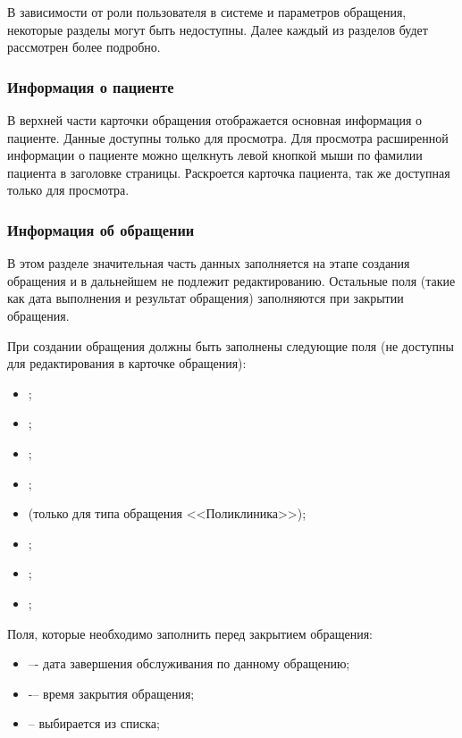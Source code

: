 {В зависимости от роли пользователя в системе и параметров обращения, некоторые разделы могут быть недоступны. Далее каждый из разделов будет рассмотрен более подробно.

\subsubsection{Информация о пациенте}

В верхней части карточки обращения отображается основная информация о пациенте. Данные доступны только для просмотра. Для просмотра расширенной информации о пациенте можно щелкнуть левой кнопкой мыши по фамилии пациента в заголовке страницы. Раскроется карточка пациента, так же доступная только для просмотра. 

\subsubsection{Информация об обращении}

В этом разделе значительная часть данных заполняется на этапе создания обращения и в дальнейшем не подлежит редактированию. Остальные поля (такие как дата выполнения и результат обращения) заполняются при закрытии обращения. 

При создании обращения должны быть заполнены следующие поля (не доступны для редактирования в карточке обращения):
\begin{itemize}
  \item {};
  \item {};
  \item {};
  \item {};
  \item {} (только для типа обращения <<Поликлиника>>);
  \item {};
  \item {};
  \item {};
\end{itemize}

Поля, которые необходимо заполнить перед закрытием обращения:
\begin{itemize}   
  \item {} –- дата завершения обслуживания по данному обращению;
  \item {} -– время закрытия обращения;
  \item {} -- выбирается из списка;
\end{itemize}

}
